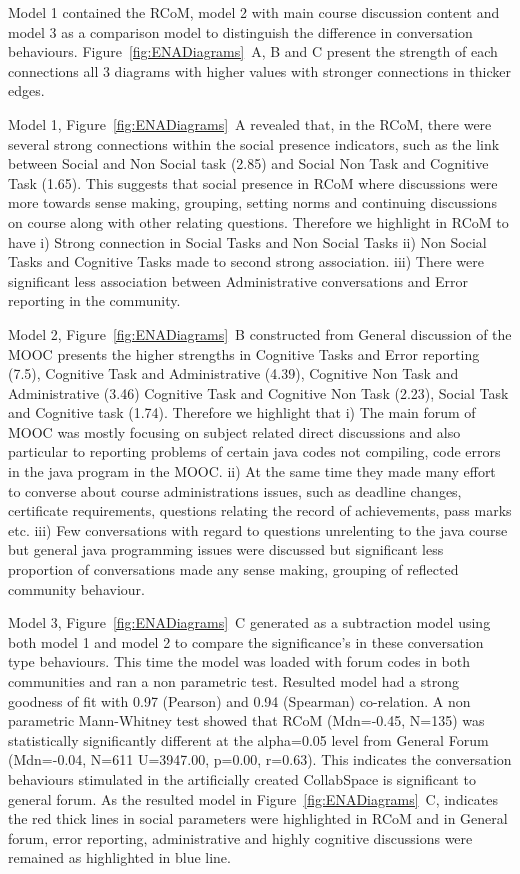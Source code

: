 \documentclass[format=acmsmall, review=false, screen=true]{acmart}
\begin{document}
Model 1 contained the RCoM, model 2 with main course discussion content and model 3 as a comparison model to distinguish the difference in conversation behaviours. Figure~\ref{fig:ENADiagrams}~A, B and C present the strength of each connections all 3 diagrams with higher values with stronger connections in thicker edges. 

Model 1, Figure~\ref{fig:ENADiagrams}~A revealed that, in the RCoM, there were several strong connections within the social presence indicators, such as the link between Social and Non Social task (2.85) and Social Non Task and Cognitive Task (1.65). This suggests that social presence in RCoM where discussions were more towards sense making, grouping, setting norms and continuing discussions on course along with other relating questions. Therefore we highlight in RCoM to have i) Strong connection in Social Tasks and Non Social Tasks ii) Non Social Tasks and Cognitive Tasks made to second strong association. iii) There were significant less association between Administrative conversations and Error reporting in the community. 

Model 2, Figure~\ref{fig:ENADiagrams}~B constructed from General discussion of the MOOC presents the higher strengths in Cognitive Tasks and Error reporting (7.5), Cognitive Task and Administrative (4.39), Cognitive Non Task and Administrative (3.46) Cognitive Task and Cognitive Non Task (2.23), Social Task and Cognitive task (1.74). Therefore we highlight that i) The main forum of MOOC was mostly focusing on subject related direct discussions and also particular to reporting problems of certain java codes not compiling, code errors in the java program in the MOOC. ii) At the same time they made many effort to converse about course administrations issues, such as deadline changes, certificate requirements, questions relating the record of achievements, pass marks etc. iii) Few conversations with regard to questions unrelenting to the java course but general java programming issues were discussed but significant less proportion of conversations made any sense making, grouping of reflected community behaviour. 

Model 3, Figure~\ref{fig:ENADiagrams}~C generated as a subtraction model using both model 1 and model 2 to compare the significance's in these conversation type behaviours. This time the model was loaded with forum codes in both communities and ran a non parametric test. Resulted model had a strong goodness of fit with 0.97 (Pearson) and 0.94 (Spearman) co-relation. A non parametric Mann-Whitney test showed that RCoM (Mdn=-0.45, N=135) was statistically significantly different at the alpha=0.05 level from General Forum (Mdn=-0.04, N=611 U=3947.00, p=0.00, r=0.63). This indicates the conversation behaviours stimulated in the artificially created CollabSpace is significant to general forum. As the resulted model in Figure~\ref{fig:ENADiagrams}~C, indicates the red thick lines in social parameters were highlighted in RCoM and in General forum, error reporting, administrative and highly cognitive discussions were remained as highlighted in blue line.
\end{document}
